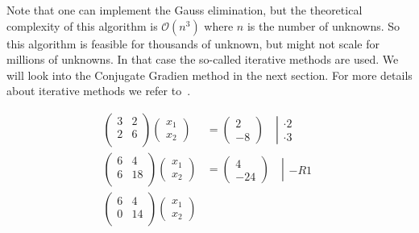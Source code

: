 \documentclass[11pt,fleqn]{book} %
\begin{document}
Note that one can implement the Gauss elimination, but the theoretical complexity of this algorithm is $\mathcal{O}(n^3)$ where $n$ is the number of unknowns. So this algorithm is feasible for thousands of unknown, but might not scale for millions of unknowns. In that case the so-called iterative methods are used. We will look into the Conjugate Gradien method in the next section. For more details about iterative methods we refer to~\cite{olshanskii2014iterative}.


\begin{align}
\left(\begin{matrix}
3 & 2 \\
2 & 6 \\
\end{matrix}\right)
\left(\begin{matrix}
x_1 \\
x_2
\end{matrix}\right)
&=\left(
\begin{matrix}
2 \\
-8
\end{matrix}\right)
\quad \left|\begin{matrix}
\cdot 2 \\
\cdot 3
\end{matrix}\right. \label{eq:gauss:1}\\
\left(\begin{matrix}
6 & 4 \\
6 & 18 \\
\end{matrix}\right)
\left(\begin{matrix}
x_1 \\
x_2
\end{matrix}\right)
&=\left(
\begin{matrix}
4 \\
-24
\end{matrix}\right)
\quad\left|\begin{matrix}
 \\
- R1 \\
\end{matrix}\right. \label{eq:gauss:2} \\
\left(\begin{matrix}
6 & 4 \\
0 & 14 \\
\end{matrix}\right)
\left(\begin{matrix}
x_1 \\
x_2
\end{matrix}\right)

\end{align}
\end{document}
